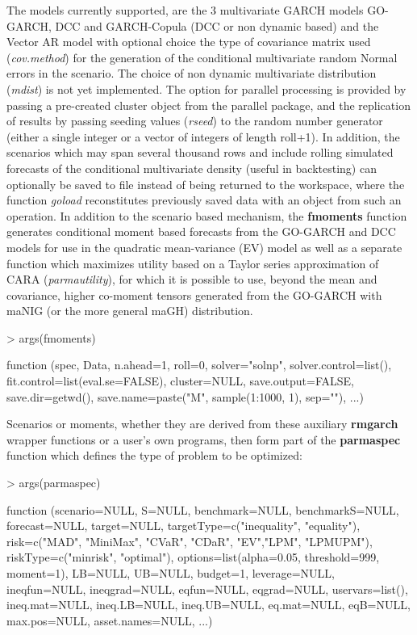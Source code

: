 The models currently supported, are the 3 multivariate GARCH models GO-GARCH,
DCC and GARCH-Copula (DCC or non dynamic based) and the Vector AR model with
optional choice the type of covariance matrix used (\emph{cov.method}) for
the generation of the conditional multivariate random Normal errors in the
scenario. The choice of non dynamic multivariate distribution (\emph{mdist})
is not yet implemented. The option for parallel processing is provided by
passing a pre-created cluster object from the parallel package, and the replication
of results by passing seeding values (\emph{rseed}) to the random number
generator (either a single integer or a vector of integers of length roll+1).
In addition, the scenarios which may span several thousand rows and include rolling
simulated forecasts of the  conditional multivariate density (useful in backtesting)
can optionally be saved to file instead of being returned to the workspace,
where the function \emph{goload} reconstitutes previously saved data with
an object from such an operation. In addition to the scenario based mechanism,
the \textbf{fmoments} function generates conditional moment based forecasts
from the GO-GARCH and DCC models for use in the quadratic mean-variance (EV)
model as well as a separate function which maximizes utility based on a
Taylor series approximation of CARA (\emph{parmautility}), for which it
is possible to use, beyond the mean and covariance, higher co-moment tensors
generated from the GO-GARCH with maNIG (or the more general maGH) distribution.
\newline
\begin{Schunk}
\begin{Sinput}
> args(fmoments)
\end{Sinput}
\begin{Soutput}
function (spec, Data, n.ahead=1, roll=0, solver="solnp",
    solver.control=list(), fit.control=list(eval.se=FALSE),
    cluster=NULL, save.output=FALSE, save.dir=getwd(),
    save.name=paste("M", sample(1:1000, 1), sep=""), ...)
\end{Soutput}
\end{Schunk}
Scenarios or moments, whether they are derived from these auxiliary \textbf{rmgarch}
wrapper functions or a user's own programs, then form part of the \textbf{parmaspec}
function which defines the type of problem to be optimized:\\
\begin{Schunk}
\begin{Sinput}
> args(parmaspec)
\end{Sinput}
\begin{Soutput}
function (scenario=NULL, S=NULL, benchmark=NULL, benchmarkS=NULL,
    forecast=NULL, target=NULL, targetType=c("inequality", "equality"),
    risk=c("MAD", "MiniMax", "CVaR", "CDaR", "EV","LPM", "LPMUPM"),
    riskType=c("minrisk", "optimal"),
    options=list(alpha=0.05, threshold=999, moment=1), LB=NULL, UB=NULL,
    budget=1, leverage=NULL, ineqfun=NULL, ineqgrad=NULL, eqfun=NULL,
    eqgrad=NULL, uservars=list(), ineq.mat=NULL, ineq.LB=NULL, ineq.UB=NULL,
    eq.mat=NULL, eqB=NULL, max.pos=NULL, asset.names=NULL, ...)
\end{Soutput}
\end{Schunk}
